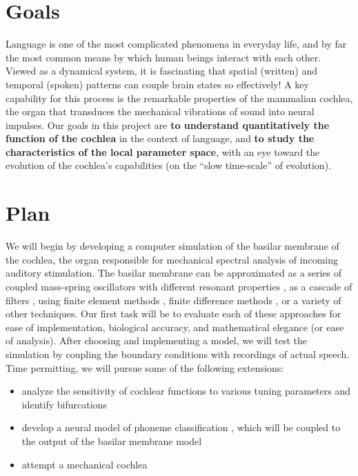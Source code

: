 

\section{Goals}

Language is one of the most complicated phenomena in everyday life, and by far
the most common means by which human beings interact with each other. Viewed as
a dynamical system, it is fascinating that spatial (written) and temporal
(spoken) patterns can couple brain states so effectively! A key capability for
this process is the remarkable properties of the mammalian cochlea, the organ
that transduces the mechanical vibrations of sound into neural impulses. Our
goals in this project are \textbf{to understand quantitatively the function of
the cochlea} in the context of language, and \textbf{to study the
characteristics of the local parameter space}, with an eye toward the evolution
of the cochlea's capabilities (on the ``slow time-scale'' of evolution\cite{manley72}).

\section{Plan}

We will begin by developing a computer simulation of the basilar membrane of
the cochlea, the organ responsible for mechanical spectral analysis of incoming
auditory stimulation\cite{nilsen99,ruggero97}. The basilar membrane can be
approximated as a series of coupled mass-spring oscillators with different
resonant properties \cite{hubbard06,hubbard96}, as a cascade of filters
\cite{linggard89}, using finite element methods \cite{skrodzka05}, finite difference methods \cite{givelberg03}, or a variety
of other techniques. Our first task will be to evaluate each of these
approaches for ease of implementation, biological accuracy, and mathematical
elegance (or ease of analysis). After choosing and implementing a model, we
will test the simulation by coupling the boundary conditions with recordings of
actual speech. Time permitting, we will pursue some of the following
extensions:

\begin{itemize}
	\item analyze the sensitivity of cochlear functions to various tuning parameters \cite{yates90} and identify bifurcations
	\item develop a neural model of phoneme classification \cite{mesgarani08}, which will be coupled to the output of the
basilar membrane model
	\item attempt a mechanical cochlea \cite{hubbard06,keolian97}
\end{itemize}






